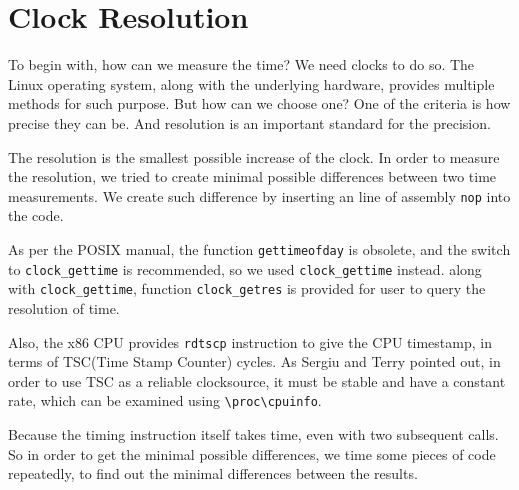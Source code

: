 \section{Clock Resolution}

To begin with, how can we measure the time? We need clocks to do so. The Linux operating system, along with the underlying hardware, provides multiple methods for such purpose. But how can we choose one? One of the criteria is how precise they can be. And resolution is an important standard for the precision.

The resolution is the smallest possible increase of the clock. In order to measure the resolution, we tried to create minimal possible differences between two time measurements. We create such difference by inserting an line of assembly \texttt{nop} into the code. 

As per the POSIX manual\cite{posix-clock-gettime}, the function \texttt{gettimeofday} is obsolete, and the switch to \texttt{clock\_gettime} is recommended, so we used \texttt{clock\_gettime} instead. along with \texttt{clock\_gettime}, function \texttt{clock\_getres} is provided for user to query the resolution of time.

Also, the x86 CPU provides \texttt{rdtscp} instruction to give the CPU timestamp, in terms of TSC(Time Stamp Counter) cycles. As Sergiu and Terry pointed out, in order to use TSC as a reliable clocksource, it must be stable and have a constant rate, which can be examined using \texttt{\textbackslash{}proc\textbackslash{}cpuinfo}\cite{constant_tsc}.

Because the timing instruction itself takes time, even with two subsequent calls. So in order to get the minimal possible differences, we time some pieces of code repeatedly, to find out the minimal differences between the results.
